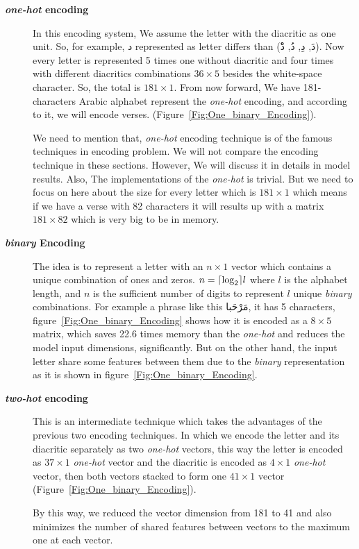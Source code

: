 \begin{description}

  \item[\textbf{\textit{one-hot} encoding}] In this encoding system, We assume the letter with the diacritic as one unit. So, for example, \textarabic{د} represented as letter differs than (\textarabic{دَ, دِ, دُ, دْْ}). Now every letter is represented 5 times one without diacritic and four times with different diacritics combinations $36 \times 5$ besides the white-space character. So, the total is $181 \times 1$. From now forward, We have 181-characters Arabic alphabet represent the \textit{one-hot} encoding, and according to it, we will encode verses. (Figure~\ref{Fig:One_binary_Encoding}).

  We need to mention that, \textit{one-hot} encoding technique is of the famous techniques in encoding problem. We will not compare the encoding technique in these sections. However, We will discuss it in details in model results. Also, The implementations of the \textit{one-hot} is trivial. But we need to focus on here about the size for every letter which is $181 \times 1$ which means if we have a verse with 82 characters it will results up with a matrix $181 \times 82$ which is very big to be in memory.

  \item[\textbf{\textit{binary} Encoding}] The idea is to represent a letter with an $n \times 1$ vector which contains a unique combination of ones and zeros.  $n =\ceil*{\log_2} l$ where $l$ is the alphabet length, and $n$ is the sufficient number of digits to represent $l$ unique \textit{binary} combinations.  For example a phrase like this \textarabic{مَرْحَبا}, it has 5 characters, figure~\ref{Fig:One_binary_Encoding} shows how it is encoded as a $8 \times 5$ matrix, which saves 22.6 times memory than the \textit{\textit{one-hot}} and reduces the model input dimensions, significantly. But on the other hand, the input letter share some features between them due to the \textit{binary} representation as it is shown in figure~\ref{Fig:One_binary_Encoding}.

  \item[\textbf{\textit{two-hot} encoding}] This is an intermediate technique which takes the advantages of the previous two encoding techniques. In which we encode the letter and its diacritic separately as two \textit{\textit{one-hot}} vectors, this way the letter is encoded as $37 \times 1$ \textit{\textit{one-hot}} vector and the diacritic is encoded as $4 \times 1$ \textit{\textit{one-hot}} vector, then both vectors stacked to form one $41 \times 1$ vector (Figure~\ref{Fig:One_binary_Encoding}).

  By this way, we reduced the vector dimension from 181 to 41 and also minimizes the number of shared features between vectors to the maximum one at each vector. 
\end{description}

